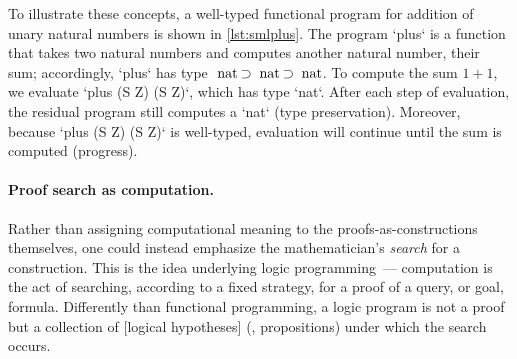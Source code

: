 To illustrate these concepts, a well-typed functional program for addition of unary natural numbers is shown in \cref{lst:smlplus}.
The program \sml`plus` is a function that takes two natural numbers and computes another natural number, their sum; accordingly, \sml`plus` has type $\text{\sml`nat`} \imp \text{\sml`nat`} \imp \text{\sml`nat`}$.
To compute the sum $1 + 1$, we evaluate \sml`plus (S Z) (S Z)`, which has type \sml`nat`.
After each step of evaluation, the residual program still computes a \sml`nat` (type preservation).
Moreover, because \sml`plus (S Z) (S Z)` is well-typed, evaluation will continue until the sum is computed (progress).




\paragraph*{Proof search as computation.}
Rather than assigning computational meaning to the proofs-as-constructions themselves, one could instead
emphasize the mathematician's \emph{search} for a construction.
This is the idea underlying logic programming~\autocites{Colmerauer+:73}{Kowalski:IFIP74}---%
computation is the act of searching, according to a fixed strategy, for a proof of a query, or goal, formula.
Differently than functional programming, a logic program is not a proof but a collection of [logical hypotheses] (\ie, propositions) under which the search occurs.

